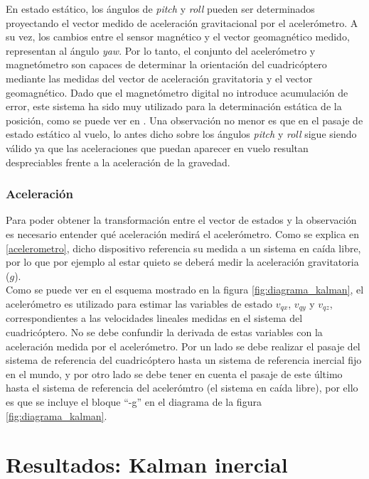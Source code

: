 \documentclass[main]{subfiles}
\begin{document}
En estado estático, los ángulos de \emph{pitch} y \emph{roll} pueden ser determinados proyectando el vector medido de aceleración gravitacional por el acelerómetro. A su vez, los cambios entre el sensor magnético y el vector geomagnético medido, representan al ángulo \emph{yaw}. Por lo tanto, el conjunto del acelerómetro y magnetómetro son capaces de determinar la orientación del cuadricóptero mediante las medidas del vector de aceleración gravitatoria y el vector geomagnético. Dado que el magnetómetro digital no introduce acumulación de error, este sistema ha sido muy utilizado para la determinación estática de la posición, como se puede ver en \cite{bib:euler_magneto_acc}. Una observación no menor es que en el pasaje de estado estático al vuelo, lo antes dicho sobre los ángulos \emph{pitch} y \emph{roll} sigue siendo válido ya que las aceleraciones que puedan aparecer en vuelo resultan despreciables frente a la aceleración de la gravedad.

\subsubsection{Aceleración}

Para poder obtener la transformación entre el vector de estados y la observación es necesario entender qué aceleración medirá el acelerómetro. Como se explica en \ref{acelerometro}, dicho dispositivo referencia su medida a un sistema en caída libre, por lo que por ejemplo al estar quieto se deberá medir la aceleración gravitatoria ($g$).\\
Como se puede ver en el esquema mostrado en la figura \ref{fig:diagrama_kalman}, el acelerómetro es utilizado para estimar las variables de estado $v_{qx}$, $v_{qy}$ y $v_{qz}$, correspondientes a las velocidades lineales medidas en el sistema del cuadricóptero. No se debe confundir la derivada de estas variables con la aceleración medida por el acelerómetro. Por un lado se debe realizar el pasaje del sistema de referencia del cuadricóptero hasta un sistema de referencia inercial fijo en el mundo, y por otro lado se debe tener en cuenta el pasaje de este último hasta el sistema de referencia del acelerómtro (el sistema en caída libre), por ello es que se incluye el bloque ``-g'' en el diagrama de la figura \ref{fig:diagrama_kalman}.



\section{Resultados: Kalman inercial}
\end{document}
